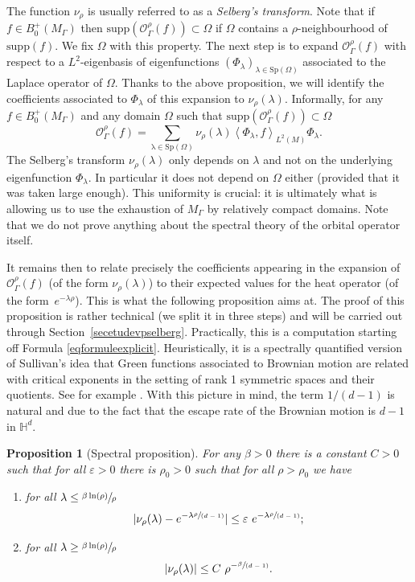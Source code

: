 \documentclass[10pt]{amsart}
\let\mathcal\mathscr
\let\epsilon\varepsilon
\newcommand{\spfrac}[2]{\sfrac{#1}{(#2)}}
\theoremstyle{plain}
\newtheorem{proposition}[equation]{Proposition}
\theoremstyle{definition}
\newcommand{\HH}{\mathbb{H}}
\newcommand{\supp}[1]{\mathrm{supp}(#1)}
\newcommand{\somme}[1]{\sum_{#1}}
\begin{document}
The function $\nu_{\rho}$ is usually referred to as a \emph{Selberg's transform}. Note that if $f \in B^+_0(M_{\Gamma})$ then $ \supp{ \mathcal{O}^{\rho}_{\Gamma}(f)} \subset \Omega$ if $\Omega$ contains a $\rho$-neighbourhood of $\supp{f}$. We fix $\Omega$ with this property. The next step is to expand $\mathcal{O}^{\rho}_{\Gamma}(f)$ with respect to a $L^2$-eigenbasis of eigenfunctions $(\Phi_{\lambda})_{\lambda \in \mathrm{Sp}(\Omega)}$ associated to the Laplace operator of $\Omega$. Thanks to the above proposition, we will identify the coefficients associated to $\Phi_{\lambda}$ of this expansion to $\nu_{\rho}(\lambda)$. Informally, for any $f \in B^+_0(M_{\Gamma})$ and any domain $\Omega$ such that $\supp{\mathcal{O}^{\rho}_{\Gamma}(f)} \subset \Omega$
\[
\mathcal{O}^{\rho}_{\Gamma}(f) = \somme{ \mathrm{\lambda \in Sp}(\Omega)} \nu_{\rho}(\lambda) \left< \Phi_{\lambda}, f \right>_{L^2(M)} \Phi_{\lambda}.
\]
The Selberg's transform $\nu_{\rho}(\lambda)$ only depends on $\lambda$ and not on the underlying eigenfunction $\Phi_{\lambda}$. In particular it does not depend on $\Omega$ either (provided that it was taken large enough). This uniformity is crucial: it is ultimately what is allowing us to use the exhaustion of $M_{\Gamma}$ by relatively compact domains. Note that we do not prove anything about the spectral theory of the orbital operator itself.

It remains then to relate precisely the coefficients appearing in the expansion of $\mathcal{O}^{\rho}_{\Gamma}(f)$ (of the form $\nu_{\rho}(\lambda)$) to their expected values for the heat operator (of the form~$e^{- \lambda \rho}$). This is what the following proposition aims at. The proof of this proposition is rather technical (we split it in three steps) and will be carried out through Section~\ref{secetudevpselberg}. Practically, this is a computation starting off Formula \eqref{eqformuleexplicit}. Heuristically, it is a spectrally quantified version of Sullivan's idea that Green functions associated to Brownian motion are related with critical exponents in the setting of rank 1 symmetric spaces and their quotients. See for example \cite{articlesullivanpositivity}. With this picture in mind, the term $1/(d-1)$ is natural and due to the fact that the escape rate of the Brownian motion is $d-1$ in $\HH^d$.

\begin{proposition}[Spectral proposition]
\label{propspectralprop}
For any $\beta >0$ there is a constant $C > 0$ such that for all $\epsilon > 0$ there is $\rho_0 > 0$ such that for all $\rho > \rho_0$ we have
\begin{enumerate}
\item for all $ \lambda \le \sfrac{\beta \ln (\rho) }{\rho} $
\[
| \nu_{\rho}(\lambda) - e^{-\lambda \spfrac{\rho}{d-1}}| \le \epsilon \ e^{ - \lambda \spfrac{\rho}{d-1}};
\]
\item for all $ \lambda \ge \sfrac{\beta \ln (\rho) }{\rho}$
\[
|\nu_{\rho}(\lambda)| \le C \ \rho^{-\spfrac{\beta}{d-1}}.
\]
\end{enumerate}
\end{proposition}
\end{document}

